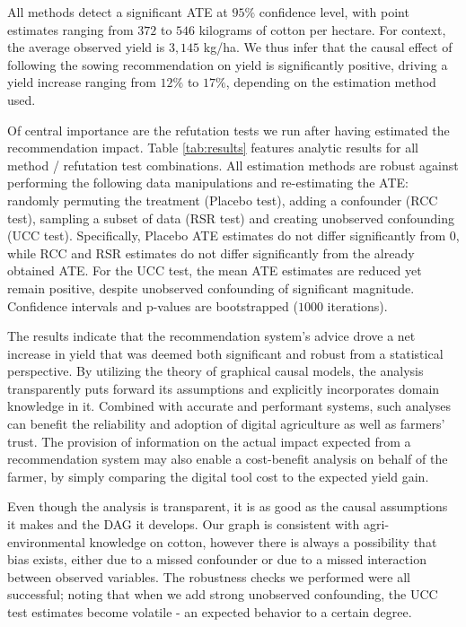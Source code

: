\documentclass[letterpaper]{article} %
\begin{document}
All methods detect a significant ATE at $95\%$ confidence level, with point estimates ranging from $372$ to $546$ kilograms of cotton per hectare. For context, the average observed yield is $3,145$ kg/ha. We thus infer that the causal effect of following the sowing recommendation on yield is significantly positive, driving a yield increase ranging from $12\%$ to $17\%$, depending on the estimation method used.

Of central importance are the refutation tests we run after having estimated the recommendation impact. Table \ref{tab:results} features analytic results for all method / refutation test combinations. All estimation methods are robust against performing the following data manipulations and re-estimating the ATE: randomly permuting the treatment (Placebo test), adding a confounder (RCC test), sampling a subset of data (RSR test) and creating unobserved confounding (UCC test). Specifically, Placebo ATE estimates do not differ significantly from $0$, while RCC and RSR estimates do not differ significantly from the already obtained ATE. For the UCC test, the mean ATE estimates are reduced yet remain positive, despite unobserved confounding of significant magnitude. Confidence intervals and p-values are bootstrapped ($1000$ iterations).

The results indicate that the recommendation system's advice drove a net increase in yield that was deemed both significant and robust from a statistical perspective. By utilizing the theory of graphical causal models, the analysis transparently puts forward its assumptions and explicitly incorporates domain knowledge in it. Combined with accurate and performant systems, such analyses can benefit the reliability and adoption of digital agriculture as well as farmers' trust. The provision of information on the actual impact expected from a recommendation system may also enable a cost-benefit analysis on behalf of the farmer, by simply comparing the digital tool cost to the expected yield gain.

Even though the analysis is transparent, it is as good as the causal assumptions it makes and the DAG it develops. Our graph is consistent with agri-environmental knowledge on cotton, however there is always a possibility that bias exists, either due to a missed confounder or due to a missed interaction between observed variables. The robustness checks we performed were all successful; noting that when we add strong unobserved confounding, the UCC test estimates become volatile - an expected behavior to a certain degree.
\end{document}
